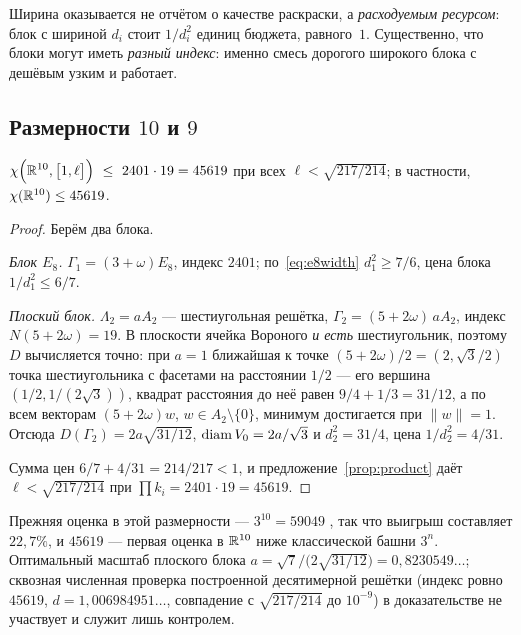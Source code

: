 Ширина оказывается не отчётом о качестве раскраски, а \emph{расходуемым
ресурсом}: блок с шириной $d_i$ стоит $1/d_i^2$ единиц бюджета, равного~$1$.
Существенно, что блоки могут иметь \emph{разный индекс}: именно смесь дорогого
широкого блока с дешёвым узким и работает.

\subsection{Размерности $10$ и $9$}

\begin{keybox}
\begin{theorem}\label{thm:dim10}
$\displaystyle\chi\Bigl(\R^{10},\bigl[1,\ell\bigr]\Bigr)\ \le\ 2401\cdot19=45619$
при всех $\ell<\sqrt{217/214}$; в частности, $\chi(\mathbb{R}^{10})\le45619$.
\end{theorem}
\end{keybox}

\begin{proof}
Берём два блока.

\emph{Блок $E_8$.} $\Gamma_1=(3+\omega)E_8$, индекс $2401$; по~\eqref{eq:e8width}
$d_1^2\ge7/6$, цена блока $1/d_1^2\le6/7$.

\emph{Плоский блок.} $\Lambda_2=aA_2$ --- шестиугольная решётка,
$\Gamma_2=(5+2\omega)\,aA_2$, индекс $N(5+2\omega)=19$. В плоскости ячейка
Вороного \emph{и есть} шестиугольник, поэтому $D$ вычисляется точно: при
$a=1$ ближайшая к точке $(5+2\omega)/2=(2,\sqrt3/2)$ точка шестиугольника с
фасетами на расстоянии $1/2$ --- его вершина $(1/2,1/(2\sqrt3))$, квадрат
расстояния до неё равен $9/4+1/3=31/12$, а по всем векторам $(5+2\omega)w$,
$w\in A_2\setminus\{0\}$, минимум достигается при $\|w\|=1$. Отсюда
$D(\Gamma_2)=2a\sqrt{31/12}$, $\operatorname{diam} V_0=2a/\sqrt3$ и $d_2^2=31/4$, цена
$1/d_2^2=4/31$.

Сумма цен $6/7+4/31=214/217<1$, и предложение~\ref{prop:product} даёт
$\ell<\sqrt{217/214}$ при $\prod k_i=2401\cdot19=45619$.
\end{proof}

Прежняя оценка в этой размерности --- $3^{10}=59049$ \cite{ABPR}, так что
выигрыш составляет $22{,}7\%$, и $45619$ --- первая оценка в $\mathbb{R}^{10}$ ниже
классической башни $3^n$. Оптимальный масштаб плоского блока
$a=\sqrt7\big/\bigl(2\sqrt{31/12}\bigr)=0{,}8230549\ldots$; сквозная численная
проверка построенной десятимерной решётки (индекс ровно $45619$,
$d=1{,}006984951\ldots$, совпадение с $\sqrt{217/214}$ до $10^{-9}$) в
доказательстве не участвует и служит лишь контролем.

